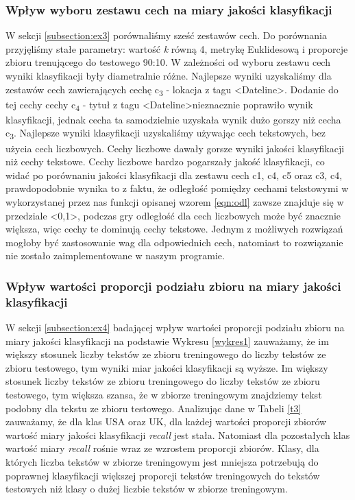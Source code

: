 \documentclass{classrep}
\begin{document}
\subsubsection{Wpływ wyboru zestawu cech na miary jakości klasyfikacji}

W sekcji \ref{subsection:ex3} porównaliśmy sześć zestawów cech. Do porównania przyjęliśmy stałe parametry: wartość \textit{k} równą 4, metrykę Euklidesową i proporcje zbioru trenującego do testowego 90:10. W zależności od wyboru zestawu cech wyniki klasyfikacji były diametralnie różne. Najlepsze wyniki uzyskaliśmy dla zestawów cech zawierających cechę c\textsubscript{3} -  lokacja z tagu \textless Dateline\textgreater. Dodanie do tej cechy cechy c\textsubscript{4} -  tytuł z tagu \textless Dateline\textgreater nieznacznie poprawiło wynik klasyfikacji, jednak cecha ta samodzielnie uzyskała wynik dużo gorszy niż cecha c\textsubscript{3}. Najlepsze wyniki klasyfikacji uzyskaliśmy używając cech  tekstowych, bez użycia cech liczbowych. Cechy liczbowe dawały gorsze wyniki jakości klasyfikacji niż cechy tekstowe. Cechy liczbowe bardzo pogarszały jakość klasyfikacji, co widać po porównaniu jakości klasyfikacji dla zestawu cech c1, c4, c5 oraz c3, c4, prawdopodobnie wynika to z faktu, że odległość pomiędzy cechami tekstowymi w wykorzystanej przez nas funkcji opisanej wzorem \ref{eqn:odl} zawsze znajduje się w przedziale \textless 0,1\textgreater , podczas gry odległość dla cech liczbowych może być znacznie większa, więc cechy te dominują cechy tekstowe. Jednym z możliwych rozwiązań mogłoby być zastosowanie wag dla odpowiednich cech, natomiast to rozwiązanie nie zostało zaimplementowane w naszym programie. 


\subsubsection{Wpływ wartości proporcji podziału zbioru na miary jakości klasyfikacji}
W sekcji \ref{subsection:ex4} badającej wpływ wartości proporcji podziału zbioru na miary jakości klasyfikacji na podstawie Wykresu \ref{wykres1} zauważamy, że im większy stosunek liczby tekstów ze zbioru treningowego do liczby tekstów ze zbioru testowego, tym wyniki miar jakości klasyfikacji są wyższe. Im większy stosunek liczby tekstów ze zbioru treningowego do liczby tekstów ze zbioru testowego, tym większa szansa, że w zbiorze treningowym znajdziemy tekst podobny dla tekstu ze zbioru testowego. Analizując dane w Tabeli \ref{t3} zauważamy, że dla klas USA oraz UK, dla każdej wartości proporcji zbiorów wartość miary jakości klasyfikacji \textit{recall} jest stała. Natomiast dla pozostałych klas wartość miary \textit{recall} rośnie wraz ze wzrostem proporcji zbiorów. Klasy, dla których liczba tekstów w zbiorze treningowym jest mniejsza potrzebują do poprawnej klasyfikacji większej proporcji tekstów treningowych do tekstów testowych niż klasy o dużej liczbie tekstów w zbiorze treningowym. 
\end{document}

